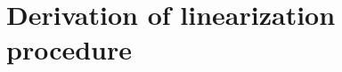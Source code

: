 \documentclass[smallcondensed,final]{svjour3}                     %
\begin{document}
%








\section{Derivation of linearization procedure}
\label{sec:derivations}
\end{document}
